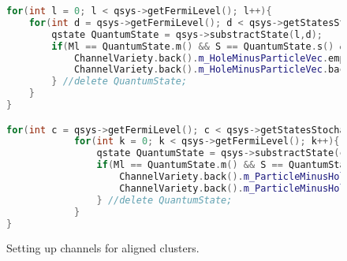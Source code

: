\begin{figure}
	\begin{lstlisting}[language=C++]
for(int l = 0; l < qsys->getFermiLevel(); l++){
	for(int d = qsys->getFermiLevel(); d < qsys->getStatesStochastic(); d++){
		qstate QuantumState = qsys->substractState(l,d);
		if(Ml == QuantumState.m() && S == QuantumState.s() && l != d){
			ChannelVariety.back().m_HoleMinusParticleVec.emplace_back(channelindexpair());
			ChannelVariety.back().m_HoleMinusParticleVec.back().set(l, d);
		} //delete QuantumState;
	}
}

for(int c = qsys->getFermiLevel(); c < qsys->getStatesStochastic(); c++){
         	for(int k = 0; k < qsys->getFermiLevel(); k++){
         		qstate QuantumState = qsys->substractState(c,k);
         		if(Ml == QuantumState.m() && S == QuantumState.s() && c != k){
         			ChannelVariety.back().m_ParticleMinusHoleVec.emplace_back(channelindexpair());
         			ChannelVariety.back().m_ParticleMinusHoleVec.back().set(c, k);
         		} //delete QuantumState;
         	}
}
\end{lstlisting}
\caption{Setting up channels for aligned clusters.} \label{f:vectors_for_channelsHminusP}
\end{figure}

